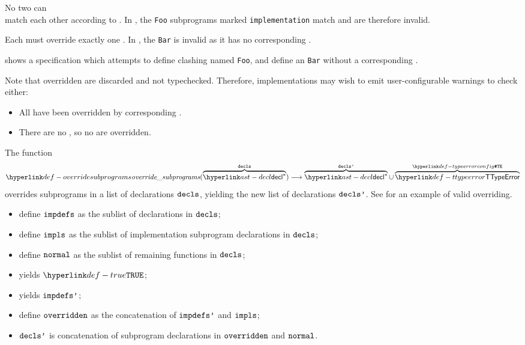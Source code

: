 No two \Proseimplementationsubprograms{} can \\
match each other according to .
In , the \verb|Foo| subprograms marked \texttt{implementation}
match and are therefore invalid.

Each \Proseimplementationsubprogram{} must override exactly one \Proseimpdefsubprogram.
In , the \Proseimplementationsubprogram{} \verb|Bar| is
invalid as it has no corresponding \Proseimpdefsubprogram{}.

 shows a specification which attempts to define clashing
\Proseimplementationsubprograms{} named \verb|Foo|, and define an
\Proseimplementationsubprogram{} \verb|Bar| without a corresponding \Proseimpdefsubprogram{}.

\noindent
Note that overridden \Proseimpdefsubprograms{} are discarded and not typechecked.
Therefore, implementations may wish to emit user-configurable warnings to check either:
\begin{itemize}
  \item All \Proseimpdefsubprograms{} have been overridden by corresponding \Proseimplementationsubprograms{}.
  \item There are no \Proseimplementationsubprograms{}, so no \Proseimpdefsubprograms{} are overridden.
\end{itemize}

\hypertarget{def-overridesubprograms}{}
The function
\[
\overridesubprograms(\overname{\decl^*}{\decls}) \aslto \overname{\decl^*}{\declsp}
\cup \overname{\TTypeError}{\TypeErrorConfig}
\]
overrides subprograms in a list of declarations $\texttt{decls}$, yielding the new list of declarations $\texttt{decls'}$.
\ProseOtherwiseTypeError{}
See  for an example of valid overriding.

\ProseParagraph
\AllApply
\begin{itemize}
  \item define $\vimpdefs$ as the sublist of \Proseimpdefsubprogram{} declarations in $\texttt{decls}$;
  \item define $\vimpls$ as the sublist of implementation subprogram declarations in $\texttt{decls}$;
  \item define $\texttt{normal}$ as the sublist of remaining functions in $\texttt{decls}$;
  \item \Prosecheckimplementationsunique{$\vimpls$} yields $\True$\ProseOrTypeError;
  \item \Proseprocessoverrides{$\vimpdefs$}{$\vimpls$} yields $\texttt{impdefs'}$\ProseOrTypeError;
  \item define $\texttt{overridden}$ as the concatenation of $\texttt{impdefs'}$ and $\vimpls$;
  \item $\texttt{decls'}$ is concatenation of subprogram declarations in $\texttt{overridden}$ and $\texttt{normal}$.
\end{itemize}

